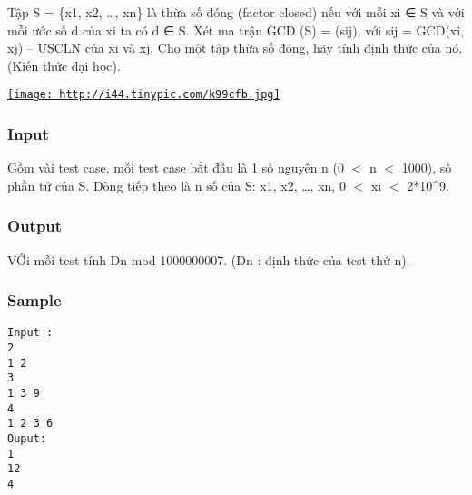 



   Tập S = \{x1, x2, …, xn\} là thừa số đóng (factor closed) nếu với mỗi xi ∈ S  và với mỗi ước số d của  xi ta có d ∈ S. Xét ma trận GCD  (S) = (sij), với sij = GCD(xi, xj) – USCLN của xi và xj.  Cho một tập thừa số đóng, hãy tính định thức của nó. (Kiến thức đại học).  

\href{http://tinypic.com}{
\texttt{[image: http://i44.tinypic.com/k99cfb.jpg]}}

\subsubsection{   Input  }



   Gồm vài test case, mỗi test case bắt đầu là 1 số nguyên n (0 $<$  n $<$ 1000),  số phần tử của S. Dòng tiếp theo là n số của S: x1, x2, …, xn,  0 $<$ xi $<$ 2*10^9.  



\subsubsection{   Output  }



   VỚi mỗi test tính Dn mod 1000000007.  (Dn : định thức của test thứ n).  



\subsubsection{   Sample  }
\begin{verbatim}
Input :
2 
1 2 
3 
1 3 9 
4 
1 2 3 6 
Ouput: 
1 
12 
4 
\end{verbatim}

